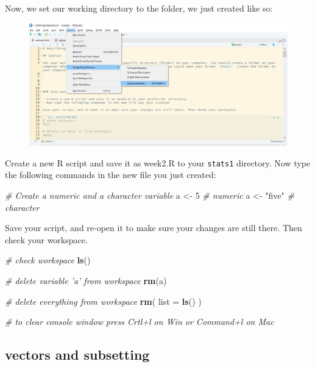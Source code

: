 \documentclass[]{book}
\newenvironment{Shaded}{\begin{snugshade}}{\end{snugshade}}
\newcommand{\KeywordTok}[1]{\textcolor[rgb]{0.13,0.29,0.53}{\textbf{#1}}}
\newcommand{\DataTypeTok}[1]{\textcolor[rgb]{0.13,0.29,0.53}{#1}}
\newcommand{\DecValTok}[1]{\textcolor[rgb]{0.00,0.00,0.81}{#1}}
\newcommand{\StringTok}[1]{\textcolor[rgb]{0.31,0.60,0.02}{#1}}
\newcommand{\CommentTok}[1]{\textcolor[rgb]{0.56,0.35,0.01}{\textit{#1}}}
\newcommand{\NormalTok}[1]{#1}
\theoremstyle{definition}
\theoremstyle{definition}
\theoremstyle{definition}
\theoremstyle{remark}
\begin{document}
Now, we set our working directory to the folder, we just created like
so:

\begin{figure}
\centering
\includegraphics{./img/setwdir.png}
\caption{}
\end{figure}

Create a new R script and save it as week2.R to your \texttt{stats1}
directory. Now type the following commands in the new file you just
created:

\begin{Shaded}
\begin{Highlighting}[]
\CommentTok{# Create a numeric and a character variable}
\NormalTok{a <-}\StringTok{ }\DecValTok{5} \CommentTok{# numeric}
\NormalTok{a <-}\StringTok{ "five"} \CommentTok{# character}
\end{Highlighting}
\end{Shaded}

Save your script, and re-open it to make sure your changes are still
there. Then check your workspace.

\begin{Shaded}
\begin{Highlighting}[]
\CommentTok{# check workspace}
\KeywordTok{ls}\NormalTok{()}

\CommentTok{# delete variable 'a' from workspace}
\KeywordTok{rm}\NormalTok{(a)}

\CommentTok{# delete everything from workspace}
\KeywordTok{rm}\NormalTok{( }\DataTypeTok{list =} \KeywordTok{ls}\NormalTok{() )}

\CommentTok{# to clear console window press Crtl+l on Win or Command+l on Mac}
\end{Highlighting}
\end{Shaded}

\subsection{vectors and subsetting}\label{vectors-and-subsetting}
\end{document}
